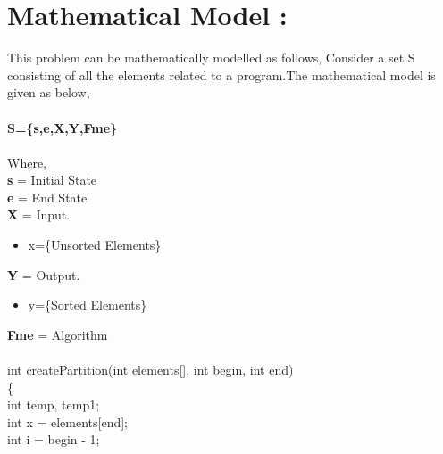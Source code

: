 \documentclass[a4paper,12pt]{article}
\begin{document}
\section{Mathematical Model : }
	This problem can be mathematically modelled as follows,
	\newpage
		Consider a set S consisting of all the elements related to a program.The mathematical model is given as below,\\\\
		\textbf{S=\{s,e,X,Y,Fme\} }\\\\
		Where,\\
		\textbf{s} = Initial State\\
		\textbf{e} = End State\\
		\textbf{X} = Input. 
		\begin{itemize}
			\item  x=\{Unsorted Elements\} 
		\end{itemize}
		\textbf{Y} = Output. 
		\begin{itemize}
			\item y=\{Sorted Elements\} 
		\end{itemize}
		\textbf{Fme} = Algorithm \\\\
		int createPartition(int elements[], int begin, int end) \\
		\{\\
		int temp, temp1;\\
		int x = elements[end];\\
		int i = begin - 1;\\
\end{document}
